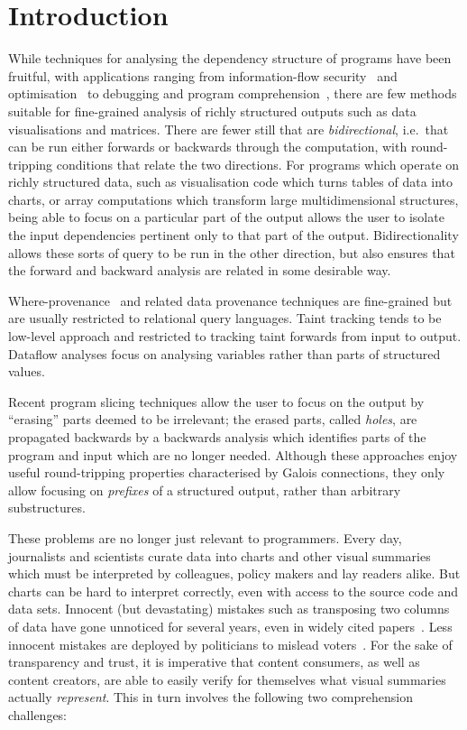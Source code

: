 \section{Introduction}

While techniques for analysing the dependency structure of programs have been fruitful, with applications ranging from information-flow security~\cite{sabelfeld03} and optimisation~\cite{kildall73} to debugging and program comprehension~\cite{weiser81,delucia96}, there are few methods suitable for fine-grained analysis of richly structured outputs such as data visualisations and matrices. There are fewer still that are \emph{bidirectional}, i.e.~that can be run either forwards or backwards through the computation, with round-tripping conditions that relate the two directions. For programs which operate on richly structured data, such as visualisation code which turns tables of data into charts, or array computations which transform large multidimensional structures, being able to focus on a particular part of the output allows the user to isolate the input dependencies pertinent only to that part of the output. Bidirectionality allows these sorts of query to be run in the other direction, but also ensures that the forward and backward analysis are related in some desirable way.

Where-provenance~\cite{buneman01} and related data provenance techniques are fine-grained but are usually restricted to relational query languages. Taint tracking \cite{newsome05} tends to be low-level approach and restricted to tracking taint forwards from input to output. Dataflow analyses \cite{reps95} focus on analysing variables rather than parts of structured values.

Recent program slicing techniques \cite{perera12a,perera13a,ricciotti17} allow the user to focus on the output by ``erasing'' parts deemed to be irrelevant; the erased parts, called \emph{holes}, are propagated backwards by a backwards analysis which identifies parts of the program and input which are no longer needed. Although these approaches enjoy useful round-tripping properties characterised by Galois connections, they only allow focusing on \emph{prefixes} of a structured output, rather than arbitrary substructures.

These problems are no longer just relevant to programmers. Every day, journalists and scientists curate data into charts and other visual summaries which must be interpreted by colleagues, policy makers and lay readers alike. But charts can be hard to interpret correctly, even with access to the source code and data sets. Innocent (but devastating) mistakes such as transposing two columns of data have gone unnoticed for several years, even in widely cited papers~\cite{miller06}. Less innocent mistakes are deployed by politicians to mislead voters~\cite{fullfact19}. For the sake of transparency and trust, it is imperative that content consumers, as well as content creators, are able to easily verify for themselves what visual summaries actually \emph{represent}. This in turn involves the following two comprehension challenges:


